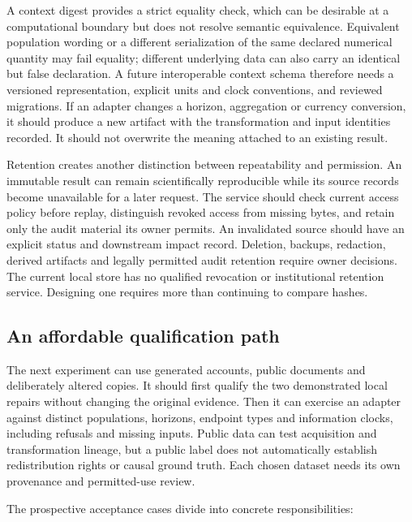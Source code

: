 A context digest provides a strict equality check, which can be
desirable at a computational boundary but does not resolve semantic
equivalence. Equivalent population wording or a different serialization
of the same declared numerical quantity may fail equality; different
underlying data can also carry an identical but false declaration. A
future interoperable context schema therefore needs a versioned
representation, explicit units and clock conventions, and reviewed
migrations. If an adapter changes a horizon, aggregation or currency
conversion, it should produce a new artifact with the transformation and
input identities recorded. It should not overwrite the meaning attached
to an existing result.

Retention creates another distinction between repeatability and
permission. An immutable result can remain scientifically reproducible
while its source records become unavailable for a later request. The
service should check current access policy before replay, distinguish
revoked access from missing bytes, and retain only the audit material
its owner permits. An invalidated source should have an explicit status
and downstream impact record. Deletion, backups, redaction, derived
artifacts and legally permitted audit retention require owner decisions.
The current local store has no qualified revocation or institutional
retention service. Designing one requires more than continuing to
compare hashes.~\citep{exec14_custody_design}

\hypertarget{an-affordable-qualification-path}{%
\subsection{An affordable qualification
path}\label{an-affordable-qualification-path}}

The next experiment can use generated accounts, public documents and
deliberately altered copies. It should first qualify the two
demonstrated local repairs without changing the original evidence. Then
it can exercise an adapter against distinct populations, horizons,
endpoint types and information clocks, including refusals and missing
inputs. Public data can test acquisition and transformation lineage, but
a public label does not automatically establish redistribution rights or
causal ground truth. Each chosen dataset needs its own provenance and
permitted-use review.

The prospective acceptance cases divide into concrete responsibilities:

